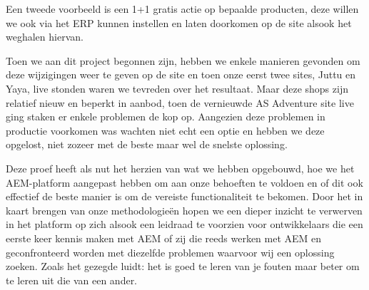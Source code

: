 \documentclass{article}
\begin{document}
	Een tweede voorbeeld is een 1+1 gratis actie op bepaalde producten, deze willen we ook via het ERP kunnen instellen en laten doorkomen op de site alsook het weghalen hiervan.
	\par
	Toen we aan dit project begonnen zijn, hebben we enkele manieren gevonden om deze wijzigingen weer te geven op de site en toen onze eerst twee sites, Juttu en Yaya, live stonden waren we tevreden over het resultaat. 
	Maar deze shops zijn relatief nieuw en beperkt in aanbod, toen de vernieuwde AS Adventure site live ging staken er enkele problemen de kop op. Aangezien deze problemen in productie voorkomen was wachten niet echt een optie en hebben we deze opgelost, niet zozeer met de beste maar wel de snelste oplossing.
	\par
	Deze proef heeft als nut het herzien van wat we hebben opgebouwd, hoe we het AEM-platform aangepast hebben om aan onze behoeften te voldoen en of dit ook effectief de beste manier is om de vereiste functionaliteit te bekomen. 
	Door het in kaart brengen van onze methodologieën hopen we een dieper inzicht te verwerven in het platform op zich alsook een leidraad te voorzien voor ontwikkelaars die een eerste keer kennis maken met AEM of zij die reeds werken met AEM en geconfronteerd worden met diezelfde problemen waarvoor wij een oplossing zoeken. 
	Zoals het gezegde luidt: het is goed te leren van je fouten maar beter om te leren uit die van een ander.
\end{document}
